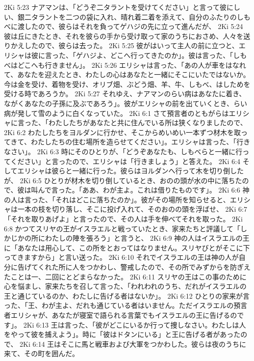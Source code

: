 2Ki 5:23  ナアマンは、「どうぞ二タラントを受けてください」と言って彼にしい、銀二タラントを二つの袋に入れ、晴れ着二着を添えて、自分のふたりのしもべに渡したので、彼らはそれを負ってゲハジの先に立って進んだが、
2Ki 5:24  彼は丘にきたとき、それを彼らの手から受け取って家のうちにおさめ、人々を送りかえしたので、彼らは去った。
2Ki 5:25  彼がはいって主人の前に立つと、エリシャは彼に言った、「ゲハジよ、どこへ行ってきたのか」。彼は言った、「しもべはどこへも行きません」。
2Ki 5:26  エリシャは言った、「あの人が車をはなれて、あなたを迎えたとき、わたしの心はあなたと一緒にそこにいたではないか。今は金を受け、着物を受け、オリブ畑、ぶどう畑、羊、牛、しもべ、はしためを受ける時であろうか。
2Ki 5:27  それゆえ、ナアマンのらい病はあなたに着き、ながくあなたの子孫に及ぶであろう」。彼がエリシャの前を出ていくとき、らい病が発して雪のように白くなっていた。
2Ki 6:1  さて預言者のともがらはエリシャに言った、「わたしたちがあなたと共に住んでいる所は狭くなりましたので、
2Ki 6:2  わたしたちをヨルダンに行かせ、そこからめいめい一本ずつ材木を取ってきて、わたしたちの住む場所を造らせてください」。エリシャは言った、「行きなさい」。
2Ki 6:3  時にそのひとりが、「どうぞあなたも、しもべらと一緒に行ってください」と言ったので、エリシャは「行きましょう」と答えた。
2Ki 6:4  そしてエリシャは彼らと一緒に行った。彼らはヨルダンへ行って木を切り倒したが、
2Ki 6:5  ひとりが材木を切り倒しているとき、おのの頭が水の中に落ちたので、彼は叫んで言った。「ああ、わが主よ。これは借りたものです」。
2Ki 6:6  神の人は言った、「それはどこに落ちたのか」。彼がその場所を知らせると、エリシャは一本の枝を切り落し、そこに投げ入れて、そのおのの頭を浮ばせ、
2Ki 6:7  「それを取りあげよ」と言ったので、その人は手を伸べてそれを取った。
2Ki 6:8  かつてスリヤの王がイスラエルと戦っていたとき、家来たちと評議して「しかじかの所にわたしの陣を張ろう」と言うと、
2Ki 6:9  神の人はイスラエルの王に「あなたは用心して、この所をとおってはなりません。スリヤびとがそこに下ってきますから」と言い送った。
2Ki 6:10  それでイスラエルの王は神の人が自分に告げてくれた所に人をつかわし、警戒したので、その所でみずからを防ぎえたことは一、二回にとどまらなかった。
2Ki 6:11  スリヤの王はこの事のために心を悩まし、家来たちを召して言った、「われわれのうち、だれがイスラエルの王と通じているのか、わたしに告げる者はないか」。
2Ki 6:12  ひとりの家来が言った、「王、わが主よ、だれも通じている者はいません。ただイスラエルの預言者エリシャが、あなたが寝室で語られる言葉でもイスラエルの王に告げるのです」。
2Ki 6:13  王は言った、「彼がどこにいるか行って捜しなさい。わたしは人をやって彼を捕えよう」。時に「彼はドタンにいる」と王に告げる者があったので、
2Ki 6:14  王はそこに馬と戦車および大軍をつかわした。彼らは夜のうちに来て、その町を囲んだ。
